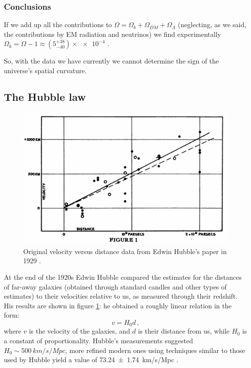 \documentclass[main.tex]{subfiles}
\begin{document}
\subsubsection{Conclusions}

If we add up all the contributions to  \(\Omega = \Omega_b + \Omega_{DM} + \Omega_{\Lambda }\) (neglecting, as we said, the contributions by EM radiation and neutrinos) we find experimentally \(\Omega_{k} = \Omega-1 \approx (5^{+38}_{-40}) \times  \num{e-4}\) \cite[Table A.2]{planckcollaborationPlanck2018Results2019a}.

So, with the data we have currently we cannot determine the sign of the universe's spatial curvature.

\subsection{The Hubble law}

\begin{figure}[ht]
\centering
\includegraphics[width=\textwidth]{figures/hubble_original.png}
\caption{Original velocity versus distance data from Edwin Hubble's paper in 1929 \cite{hubbleedwinRelationDistanceRadial1929}.}
\label{fig:hubble_original}
\end{figure}

At the end of the 1920s Edwin Hubble compared the estimates for the distances of far-away galaxies (obtained through standard candles and other types of estimates) to their velocities relative to us, as measured through their redshift. His results are shown in figure \ref{fig:hubble_original}: he obtained a roughly linear relation in the form:
%
\begin{equation}
  v = H_0 d\,,
\end{equation}
%
where \(v\) is the velocity of the galaxies, and \(d\) is their distance from us, while \(H_0 \) is a constant of proportionality.
Hubble's measurements suggested \(H_0 \sim \SI{500}{km/s/Mpc}\), more refined modern ones using techniques similar to those used by Hubble yield a value of \SI{73.24(174)}{km/s/Mpc} \cite{riessDeterminationLocalValue2016}.
\end{document}
